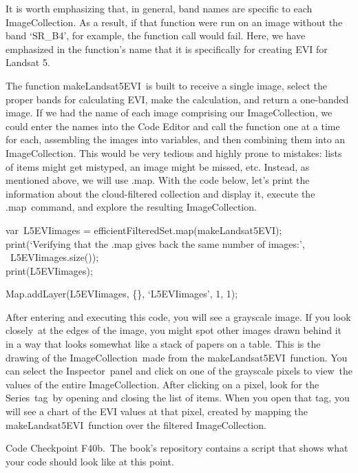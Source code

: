 \documentclass[
  letterpaper,
  DIV=11,
  numbers=noendperiod]{scrreprt}
\begin{document}
It is worth emphasizing that, in general, band names are specific to
each ImageCollection. As a result, if that function were run on an image
without the band `SR\_B4', for example, the function call would fail.
Here, we have emphasized in the function's name that it is specifically
for creating EVI for Landsat 5. ~

The function makeLandsat5EVI~is built to receive a single image, select
the proper bands for calculating EVI, make the calculation, and return a
one-banded image. If we had the name of each image comprising our
ImageCollection, we could enter the names into the Code Editor and call
the function one at a time for each, assembling the images into
variables, and then combining them into an ImageCollection. This would
be very tedious and highly prone to mistakes: lists of items might get
mistyped, an image might be missed, etc. Instead, as mentioned above, we
will use .map. With the code below, let's print the information about
the cloud-filtered collection and display it, execute the .map~command,
and explore the resulting ImageCollection.

var~L5EVIimages = efficientFilteredSet.map(makeLandsat5EVI);\\
print(`Verifying that the .map gives back the same number of images:',\\
\hspace*{0.333em} ~L5EVIimages.size());\\
print(L5EVIimages);

Map.addLayer(L5EVIimages, \{\}, `L5EVIimages', 1, 1);

After entering and executing this code, you will see a grayscale image.
If you look closely~at the edges of the image, you might spot other
images drawn behind it in a way that looks somewhat like a stack of
papers on a table. This is the drawing of the ImageCollection~made from
the makeLandsat5EVI~function. You can select the Inspector~panel and
click on one of the grayscale pixels to view~the values of the entire
ImageCollection. After clicking on a pixel, look for the Series~tag~by
opening and closing the list of items. When you open that tag, you will
see a chart of the EVI values at that pixel, created by mapping the
makeLandsat5EVI~function over the filtered ImageCollection.

\begin{tcolorbox}[enhanced jigsaw, left=2mm, breakable, rightrule=.15mm, opacityback=0, colframe=quarto-callout-note-color-frame, colbacktitle=quarto-callout-note-color!10!white, arc=.35mm, opacitybacktitle=0.6, toptitle=1mm, colback=white, leftrule=.75mm, title=\textcolor{quarto-callout-note-color}{\faInfo}\hspace{0.5em}{Note}, toprule=.15mm, bottomtitle=1mm, titlerule=0mm, bottomrule=.15mm, coltitle=black]

Code Checkpoint F40b.~The book's repository contains a script that shows
what your code should look like at this point.

\end{tcolorbox}
\end{document}
